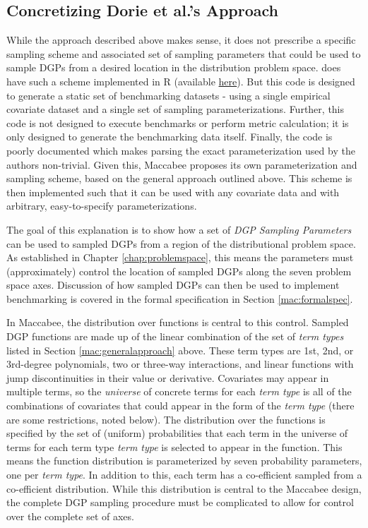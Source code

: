 \documentclass[../main.tex]{subfiles}
\begin{document}
\subsection{Concretizing Dorie et al.'s Approach}

While the approach described above makes sense, it does not prescribe a specific sampling scheme and associated set of sampling parameters that could be used to sample DGPs from a desired location in the distribution problem space. \textcite{Dorie2019Automated1} does have such a scheme implemented in R (available \href{https://github.com/vdorie/aciccomp}{here}). But this code is designed to generate a static set of benchmarking datasets - using a single empirical covariate dataset and a single set of sampling parameterizations. Further, this code is not designed to execute benchmarks or perform metric calculation; it is only designed to generate the benchmarking data itself. Finally, the code is poorly documented which makes parsing the exact parameterization used by the authors non-trivial. Given this, Maccabee proposes its own parameterization and sampling scheme, based on the general approach outlined above. This scheme is then implemented such that it can be used with any covariate data and with arbitrary, easy-to-specify parameterizations.

\vspace{\baselineskip}

The goal of this explanation is to show how a set of \textit{DGP Sampling Parameters} can be used to sampled DGPs from a region of the distributional problem space. As established in Chapter \ref{chap:problemspace}, this means the parameters must (approximately) control the location of sampled DGPs along the seven problem space axes. Discussion of how sampled DGPs can then be used to implement benchmarking is covered in the formal specification in Section \ref{mac:formalspec}.

\vspace{\baselineskip}

In Maccabee, the distribution over functions is central to this control. Sampled DGP functions are made up of the linear combination of the set of \textit{term types} listed in Section \ref{mac:generalapproach} above. These term types are 1st, 2nd, or 3rd-degree polynomials, two or three-way interactions, and linear functions with jump discontinuities in their value or derivative. Covariates may appear in multiple terms, so the \textit{universe} of concrete terms for each \textit{term type} is all of the combinations of covariates that could appear in the form of the \textit{term type} (there are some restrictions, noted below). The distribution over the functions is specified by the set of (uniform) probabilities that each term in the universe of terms for each term type \textit{term type} is selected to appear in the function. This means the function distribution is parameterized by seven probability parameters, one per \textit{term type}. In addition to this, each term has a co-efficient sampled from a co-efficient distribution. While this distribution is central to the Maccabee design, the complete DGP sampling procedure must be complicated to allow for control over the complete set of axes.
\end{document}
